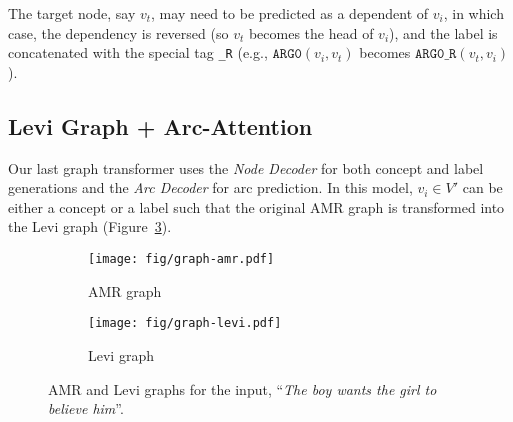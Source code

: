 \documentclass[11pt,a4paper]{article}
\newcommand{\LN}{\linebreak\noindent}    \newcommand{\textsec}[1]{\textsection\ref{#1}}
\begin{document}
The target node, say $v_t$, may need to be predicted as a dependent of $v_i$, in which case, the dependency is reversed (so $v_t$ becomes the head of $v_i$), and the label is concatenated with the special tag \texttt{\_R} (e.g., $\texttt{ARG0}(v_i, v_t)$ becomes $\texttt{ARG0\_R}(v_t, v_i)$).




\subsection{Levi Graph + Arc-Attention}
\label{ssec:concept-label-attention}

Our last graph transformer uses the \textit{Node Decoder} for both concept and label generations and the \textit{Arc Decoder} for arc prediction.
In this model, $v_i \in V'$ can be either a concept or a label such that the original AMR graph is transformed into the Levi graph\LN \cite{levi1942finite, beck-etal-2018-graph} (Figure~\ref{fig:graph-amr-levi}).

\begin{figure}[htbp!]
 \centering
 \begin{subfigure}[b]{0.44\columnwidth}
     \centering
     \texttt{[image: fig/graph-amr.pdf]}
     \caption{AMR graph}
     \label{fig:graph-amr}
 \end{subfigure}
 \hfill
 \begin{subfigure}[b]{0.50\columnwidth}
     \centering
     \texttt{[image: fig/graph-levi.pdf]}
     \caption{Levi graph}
     \label{fig:graph-levi}
 \end{subfigure}
\caption{AMR and Levi graphs for the input, ``\textit{The boy wants the girl to believe him}''.}
\label{fig:graph-amr-levi}
\end{figure}
\end{document}
